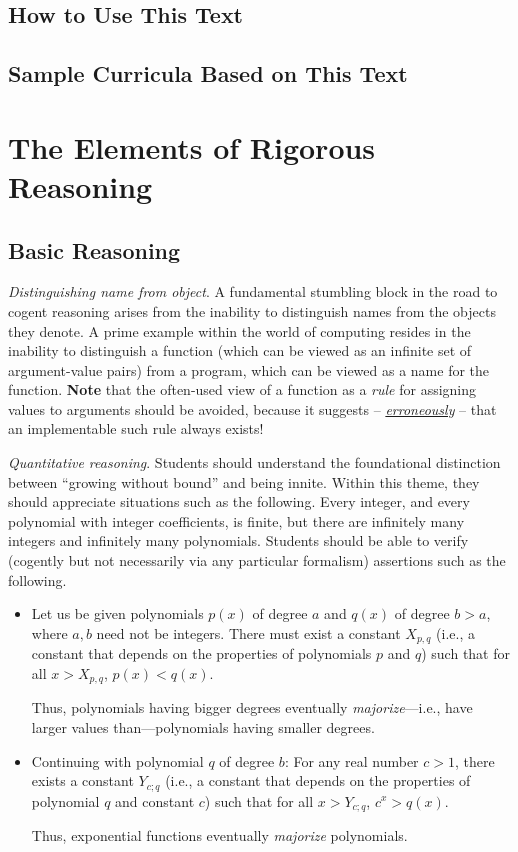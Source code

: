 \subsection{How to Use This Text}
\label{sec:how-to-use}


\subsection{Sample Curricula Based on This Text}
\label{sec:sample-curricula}



\section{The Elements of Rigorous Reasoning}
\label{sec:elements-of-reasoning}

\subsection{Basic Reasoning}

{\em Distinguishing name from object}.
%
A fundamental stumbling block in the road to cogent reasoning arises
from the inability to distinguish names from the objects they denote.
A prime example within the world of computing resides in the inability
to distinguish a function (which can be viewed as an infinite set of
argument-value pairs) from a program, which can be viewed as a name
for the function.  {\bf Note} that the often-used view of a function
as a {\em rule} for assigning values to arguments should be avoided,
because it suggests -- \underline{\em erroneously} -- that an
implementable such rule always exists!

{\em Quantitative reasoning}.
%
Students should understand the foundational distinction between
``growing without bound'' and being innite.  Within this theme, they
should appreciate situations such as the following.  Every integer,
and every polynomial with integer coefficients, is finite, but there
are infinitely many integers and infinitely many polynomials.
Students should be able to verify (cogently but not necessarily via
any particular formalism) assertions such as the following.
\begin{itemize}
\item
Let us be given polynomials $p(x)$ of degree $a$ and $q(x)$ of degree
$b > a$, where $a, b$ need not be integers.  There must exist a
constant $X_{p,q}$ (i.e., a constant that depends on the properties of
polynomials $p$ and $q$) such that for all $x > X_{p,q}$, $p(x) <
q(x)$.

Thus, polynomials having bigger degrees eventually {\em
  majorize}---i.e., have larger values than---polynomials having
smaller degrees.

\item
Continuing with polynomial $q$ of degree $b$: For any real number $c >
1$, there exists a constant $Y_{c;q}$ (i.e., a constant that depends
on the properties of polynomial $q$ and constant $c$) such that for
all $x > Y_{c;q}$, $c^x > q(x)$.

Thus, exponential functions eventually {\em majorize} polynomials.
\end{itemize}

